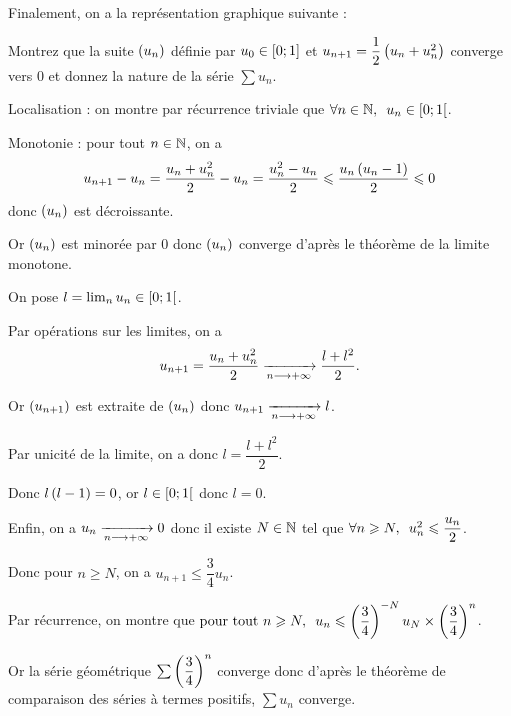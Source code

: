 \begin{corr}
Finalement, on a la représentation graphique suivante :

\begin{center}
\end{center}
\end{corr}

\begin{exo}
Montrez que la suite \(\left(u_n\right)\) définie par \(u_0\in\left[0;1\right]\) et \(u_{n+1}=\dfrac{1}{2}\left(u_n+u_n^2\right)\) converge vers \(0\) et donnez la nature de la série \(\sum u_n\).
\end{exo}

\begin{corr}
Localisation : on montre par récurrence triviale que \(\quantifs{\forall n\in\N}u_n\in\intervie{0}{1}\).

Monotonie : pour tout \(n\in\mathbb{N}\), on a \[u_{n+1}-u_n=\dfrac{u_n+u_n^2}{2}-u_n=\dfrac{u_n^2-u_n}{2}\leqslant\dfrac{u_n\left(u_n-1\right)}{2}\leqslant0\] donc \(\left(u_n\right)\) est décroissante.

Or \(\left(u_n\right)\) est minorée par \(0\) donc \(\left(u_n\right)\) converge d'après le théorème de la limite monotone.

On pose \(l=\lim_nu_n\in\left[0;1\right[\).

Par opérations sur les limites, on a \[u_{n+1}=\dfrac{u_n+u_n^2}{2}\xrightarrow[n\longrightarrow+\infty]{}\dfrac{l+l^2}{2}.\]

Or \(\left(u_{n+1}\right)\) est extraite de \(\left(u_n\right)\) donc \(u_{n+1}\xrightarrow[n\longrightarrow+\infty]{}l\).

Par unicité de la limite, on a donc \(l=\dfrac{l+l^2}{2}\).

Donc \(l\left(l-1\right)=0\), or \(l\in\left[0;1\right[\) donc \(l=0\).

Enfin, on a \(u_n\xrightarrow[n\longrightarrow+\infty]{}0\) donc il existe \(N\in\mathbb{N}\) tel que \(\quantifs{\forall n\geq N}u_n^2\leq\dfrac{u_n}{2}\).

Donc pour \(n\geq N\), on a \(u_{n+1}\leq\dfrac{3}{4}u_n\).

Par récurrence, on montre que \(\quantifs{\tpt n\geq N}u_n\leq\paren{\dfrac{3}{4}}^{-N}u_N\times\paren{\dfrac{3}{4}}^n\).

Or la série géométrique \(\sum\left(\dfrac{3}{4}\right)^n\) converge donc d'après le théorème de comparaison des séries à termes positifs, \(\sum u_n\) converge.
\end{corr}

